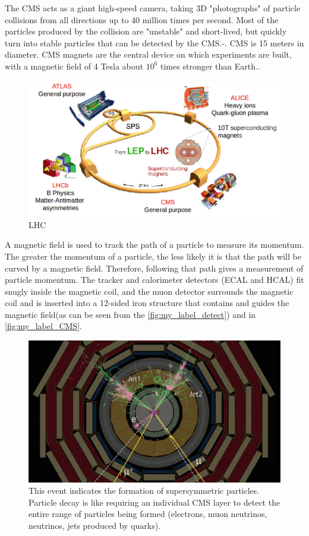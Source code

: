 The CMS acts as a giant high-speed camera, taking 3D "photographs" of particle collisions from all directions up to 40 million times per second. Most of the particles produced by the collision are "unstable" and short-lived, but quickly turn into stable particles that can be detected by the CMS.\cite{CMS_1}-\cite{CMS:2008xjf}.
 CMS is 15 meters in diameter. CMS magnets are the central device on which experiments are built, with a magnetic field of 4 Tesla about $10^6$ times stronger than Earth.\cite{CMS:2008xjf}\cite{CMS_2}.
 \begin{figure}[H]
     \centering
     \includegraphics[scale=0.3]{Detector/14__ml.png}
     \caption{LHC}
     \label{fig:my_label_LHC}
 \end{figure}
A magnetic field is used to track the path of a particle to measure its momentum\cite{CMS_1}. The greater the momentum of a particle, the less likely it is that the  path will be curved by a magnetic field. Therefore, following that path gives a measurement of particle momentum. The tracker and calorimeter detectors (ECAL and HCAL) fit snugly inside the magnetic coil, and the muon detector surrounds the magnetic coil and is inserted into a 12-sided iron structure that contains and guides the magnetic field(as can be seen from the \autoref{fig:my_label_detect})\cite{CMS_2} and in \autoref{fig:my_label_CMS}.
\begin{figure}[H]
    \centering
    \includegraphics[scale=0.3]{Detector/SusyAny.jpg}
    \caption{This event indicates the formation of  supersymmetric particles. Particle decay  is like requiring an individual CMS layer  to detect the entire range of particles being formed (electrons, muon neutrinos, neutrinos, jets produced by quarks).\cite{CMS_3}}
    \label{fig:my_label_detect}
\end{figure}

